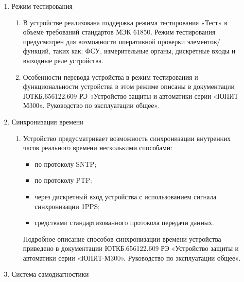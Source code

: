 \begin{enumerate}
\begin{enumerate}
\end{enumerate}

\item Режим тестирования
\begin{enumerate}

\item В устройстве реализована поддержка режима тестирования «Тест» в объеме требований стандартов МЭК 61850. Режим тестирования предусмотрен для возможности оперативной проверки элементов/функций, таких как: ФСУ, измерительные органы, дискретные входы и выходные реле устройства.

\item  Особенности перевода устройства в режим тестирования и функциональности устройства в этом режиме описаны в документации ЮТКБ.656122.609 РЭ «Устройство защиты и автоматики серии «ЮНИТ-М300». Руководство по эксплуатации общее».

\end{enumerate}

\item Синхронизация времени
\begin{enumerate}

\item
Устройство предусматривает возможность синхронизации внутренних часов реального времени несколькими способами:
\begin{itemize}
\item по протоколу SNTP;
\item по протоколу PTP;
\item через дискретный вход устройства с использованием сигнала синхронизации 1PPS;
\item {средствами стандартизованного протокола передачи данных.}
\end{itemize}
Подробное описание способов синхронизации времени устройства приведено в документации ЮТКБ.656122.609 РЭ «Устройство защиты и автоматики серии «ЮНИТ-М300». Руководство по эксплуатации общее».

\end{enumerate}

\item Система самодиагностики
\begin{enumerate}


\end{enumerate}
\end{enumerate}
